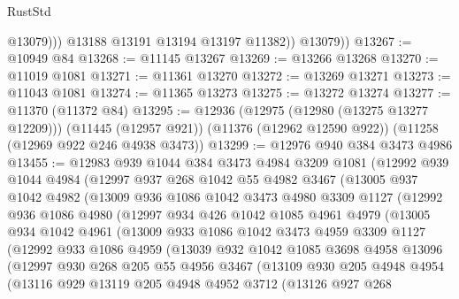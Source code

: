 \begin{lexlean}{RustStd}
\begin{coremodule}
{{{{{{{{{{{{{{{{{{{                  @13079)))
            @13188
            @13191
            @13194
            @13197
            @11382))
        @13079))
@13267 := @10949 @84
@13268 := @11145 @13267
@13269 := @13266 @13268
@13270 := @11019 @1081
@13271 := @11361 @13270
@13272 := @13269 @13271
@13273 := @11043 @1081
@13274 := @11365 @13273
@13275 := @13272 @13274
@13277 := @11370 (@11372 @84)
@13295 := @12936
    (@12975 (@12980 (@13275 @13277 @12209)))
    (@11445 (@12957 @921))
    (@11376 (@12962 @12590 @922))
    (@11258 (@12969 @922 @246 @4938 @3473))
@13299 := @12976 @940 @384 @3473 @4986
@13455 := @12983
    @939
    @1044
    @384
    @3473
    @4984
    @3209
    @1081
    (@12992
      @939
      @1044
      @4984
      (@12997
        @937
        @268
        @1042
        @55
        @4982
        @3467
        (@13005
          @937
          @1042
          @4982
          (@13009
            @936
            @1086
            @1042
            @3473
            @4980
            @3309
            @1127
            (@12992
              @936
              @1086
              @4980
              (@12997
                @934
                @426
                @1042
                @1085
                @4961
                @4979
                (@13005
                  @934
                  @1042
                  @4961
                  (@13009
                    @933
                    @1086
                    @1042
                    @3473
                    @4959
                    @3309
                    @1127
                    (@12992
                      @933
                      @1086
                      @4959
                      (@13039
                        @932
                        @1042
                        @1085
                        @3698
                        @4958
                        @13096
                        (@12997
                          @930
                          @268
                          @205
                          @55
                          @4956
                          @3467
                          (@13109
                            @930
                            @205
                            @4948
                            @4954
                            (@13116
                              @929
                              @13119
                              @205
                              @4948
                              @4952
                              @3712
                              (@13126
                                @927
                                @268
}}}}}}}}}}}}}}}}}}}
\end{coremodule}
\end{lexlean}
